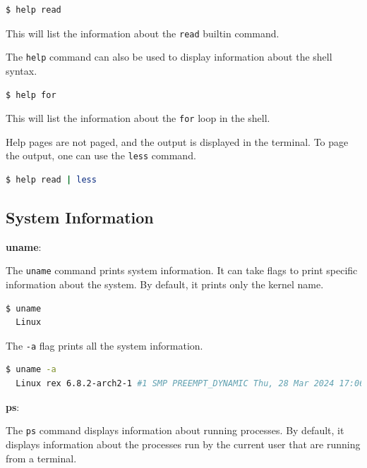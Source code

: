 \begin{lstlisting}[language=bash]
$ help read
\end{lstlisting}

This will list the information about the \texttt{read} builtin command.

The \texttt{help} command can also be used to display information about the shell syntax.

\begin{lstlisting}[language=bash]
$ help for
\end{lstlisting}

This will list the information about the \texttt{for} loop in the shell.

Help pages are not paged, and the output is displayed in the terminal.
To page the output, one can use the \texttt{less} command.

\begin{lstlisting}[language=bash]
$ help read | less
\end{lstlisting}


\subsection{System Information}

\textbf{uname}:

The \texttt{uname} command prints system information.
It can take flags to print specific information about the system.
By default, it prints only the kernel name.

\begin{lstlisting}[language=bash]
  $ uname
  Linux
\end{lstlisting}

The \texttt{-a} flag prints all the system information.

\begin{lstlisting}[language=bash]
  $ uname -a
  Linux rex 6.8.2-arch2-1 #1 SMP PREEMPT_DYNAMIC Thu, 28 Mar 2024 17:06:35 +0000 x86_64 GNU/Linux
\end{lstlisting}

\textbf{ps}:

The \texttt{ps} command displays information about running processes.
By default, it displays information about the processes run by the current user that are running from a terminal.

